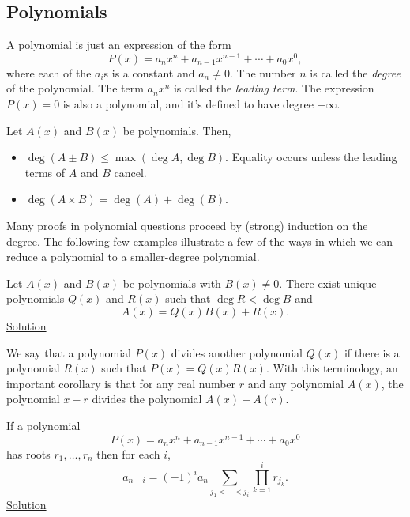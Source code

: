 \subsection{Polynomials}
A polynomial is just an expression of the form
\[P(x)=a_n x^n+a_{n-1}x^{n-1}+\cdots+a_0x^0,\] where each of the $a_i$s is a
constant and $a_n\ne 0$.
The number $n$ is called the \emph{degree} of the polynomial. The term $a_n x^n$
is called the \emph{leading term}. The expression
$P(x)=0$ is also a polynomial, and it's defined to have degree $-\infty$.

\begin{result}\label{r:i:a:polys:1}
  Let $A(x)$ and $B(x)$ be polynomials. Then,
  \begin{itemize}
    \item $\deg(A\pm B)\le\max(\deg A,\deg B)$. Equality occurs unless the
      leading terms of $A$ and $B$ cancel.
    \item $\deg(A\times B)=\deg(A)+\deg(B)$.
  \end{itemize}
\end{result}

Many proofs in polynomial questions proceed by (strong) induction on the degree. The
following few examples illustrate a few of the ways in which we can reduce a
polynomial to a smaller-degree polynomial.

\begin{result}\label{r:i:a:polys:2}
  Let $A(x)$ and $B(x)$ be polynomials with $B(x)\ne 0$. There exist unique
  polynomials $Q(x)$ and $R(x)$ such that $\deg R<\deg B$ and
  \[A(x)=Q(x)B(x)+R(x).\]
  \hyperlink{sr:i:a:polys:2}{Solution}
\end{result}
We say that a polynomial $P(x)$ divides another polynomial $Q(x)$ if there is a
polynomial $R(x)$ such that $P(x)=Q(x)R(x)$.
With this terminology, an important corollary is that for any real number $r$ and any polynomial
$A(x)$, the polynomial $x-r$ divides the polynomial $A(x)-A(r)$.
\begin{result}\label{r:i:a:polys:3}
  If a polynomial \[P(x)=a_n x^n+a_{n-1}x^{n-1}+\cdots+a_0x^0\] has roots
  $r_1,\ldots,r_n$ then for each $i$, \[a_{n-i}=(-1)^i a_n
  \sum_{j_1<\cdots<j_i} \prod_{k=1}^i r_{j_k}.\]
  \hyperlink{sr:i:a:polys:3}{Solution}
\end{result}
